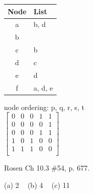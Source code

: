 \begin{questions}
    \ifprintanswers
        \vspace{-10pt}
    \fi
    \begin{solution}
    \begin{minipage}[t]{0.2\textwidth}
        \begin{tabular}{c|l}
            Node & List \\
            \hline
            a & b, d \\
            b &      \\
            c & b    \\
            d & c    \\
            e & d    \\
            f & a, d, e
        \end{tabular}
    \end{minipage}
    \begin{minipage}[T]{0.3\textwidth}
        
    \end{minipage}
    \hspace{0.3in}
    \begin{minipage}[T]{0.2\textwidth}
        node ordering: p, q, r, s, t \\
        $ \begin{bmatrix}
            0 & 0 & 0 & 1 & 1 \\
            0 & 0 & 0 & 0 & 1 \\
            0 & 0 & 0 & 1 & 1 \\
            1 & 0 & 1 & 0 & 0 \\
            1 & 1 & 1 & 0 & 0 \\
        \end{bmatrix} $
    \end{minipage}
    \end{solution}




 Rosen Ch 10.3 \#54, p. 677.
    \ifprintanswers
        \vspace{-10pt}
    \fi
    \begin{solution}
        (a) 2 $\;\;$ (b) 4 $\;\;$ (c) 11
        


\end{solution}
\end{questions}
